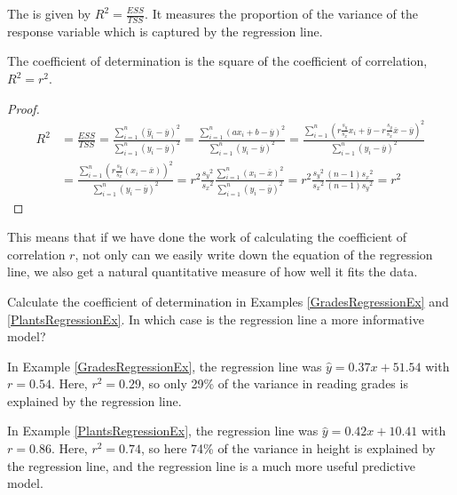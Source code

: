 \begin{definition} 
The  is given by $R^2 = \frac{ESS}{TSS}$. It measures the proportion of the variance of the response variable which is captured by the regression line.
\end{definition}

\begin{theorem}
The coefficient of determination is the square of the coefficient of correlation, $R^2 = r^2$.
\end{theorem}
\begin{proof}
$$\begin{aligned} R^2 &= \frac{ESS}{TSS}
= \frac{\sum_{i=1}^{n}(\widehat{y}_i - \overline{y})^2}{\sum_{i=1}^{n}(y_i - \overline{y})^2} 
= \frac{\sum_{i=1}^{n}(ax_i+b - \overline{y})^2}{\sum_{i=1}^{n}(y_i - \overline{y})^2}
= \frac{\sum_{i=1}^{n}(r\frac{s_y}{s_x} x_i + \overline{y} - r\frac{s_y}{s_x}\overline{x} - \overline{y})^2}{\sum_{i=1}^{n}(y_i - \overline{y})^2} \\[2ex] 
&= \frac{\sum_{i=1}^{n}(r\frac{s_y}{s_x}(x_i - \overline{x}))^2}{\sum_{i=1}^{n}(y_i - \overline{y})^2} = r^2\frac{{s_y}^2}{{s_x}^2} \frac{\sum_{i=1}^{n}(x_i - \overline{x})^2}{\sum_{i=1}^{n}(y_i - \overline{y})^2} = r^2\frac{{s_y}^2}{{s_x}^2} \frac{(n-1){s_x}^2}{(n-1){s_y}^2} = r^2 \end{aligned}$$
\end{proof}

This means that if we have done the work of calculating the coefficient of correlation $r$, not only can we easily write down the equation of the regression line, we also get a natural quantitative measure of how well it fits the data.

\begin{example}
Calculate the coefficient of determination in Examples \ref{GradesRegressionEx} and \ref{PlantsRegressionEx}. In which case is the regression line a more informative model?

In Example \ref{GradesRegressionEx}, the regression line was $\widehat{y} = 0.37x+51.54$ with $r = 0.54$. Here, $r^2 = 0.29$, so only 29\% of the variance in reading grades is explained by the regression line.

In Example \ref{PlantsRegressionEx}, the regression line was $\widehat{y} = 0.42x+10.41$ with $r = 0.86$. Here, $r^2 = 0.74$, so here 74\% of the variance in height is explained by the regression line, and the regression line is a much more useful predictive model.
\end{example}

